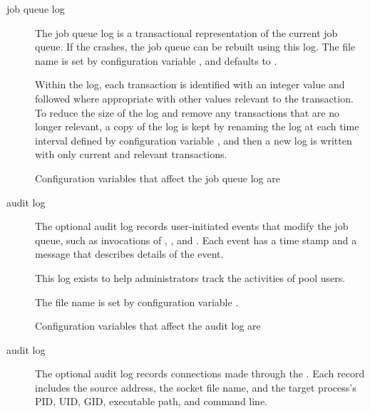 \begin{description}
\item[job queue log]
  The job queue log is a transactional representation of the current job queue. 
  If the  crashes, the job queue can be rebuilt using
  this log.
  The file name is set by configuration variable ,
  and defaults to .

  Within the log,
  each transaction is identified with an integer value and followed where
  appropriate with other values relevant to the transaction.
  To reduce the size of the log and remove any transactions that are 
  no longer relevant,
  a copy of the log is kept
  by renaming the log at each time interval defined by configuration variable
  , 
  and then a new log is written with only current and relevant transactions. 

  Configuration variables that affect the job queue log are 
  \begin{description}
  \item [] 
  \item [] 
  \item [] 
  \item [] 
  \item [] 
  \end{description}

\item[ audit log]
  The optional  audit log records user-initiated events
  that modify the job queue, such as invocations of ,
  ,  and .
  Each event has a time stamp and a message that describes details of
  the event.

  This log exists to help administrators track the activities of pool users.

  The file name is set by configuration variable .

  Configuration variables that affect the audit log are 
  \begin{description}
  \item [] 
  \item [] 
  \end{description}

\item[ audit log]
  The optional  audit log records connections made
  through the .  Each record includes the source
  address, the socket file name, and the target process's PID, UID, GID,
  executable path, and command line.


\end{description}
